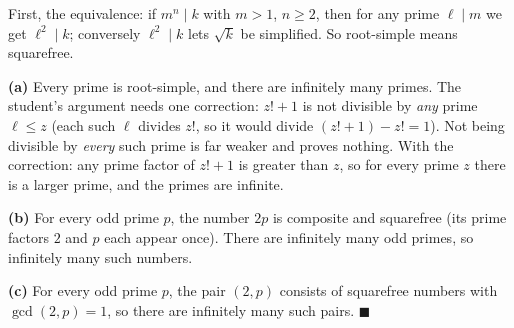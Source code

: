 First, the equivalence: if $m^n\mid k$ with $m>1$, $n\ge2$, then for any prime $\ell\mid m$ we get $\ell^2\mid k$; conversely $\ell^2\mid k$ lets $\sqrt{k}$ be simplified. So root-simple means squarefree.

\textbf{(a)} Every prime is root-simple, and there are infinitely many primes. The student's argument needs one correction: $z!+1$ is not divisible by \emph{any} prime $\ell\le z$ (each such $\ell$ divides $z!$, so it would divide $(z!+1)-z!=1$). Not being divisible by \emph{every} such prime is far weaker and proves nothing. With the correction: any prime factor of $z!+1$ is greater than $z$, so for every prime $z$ there is a larger prime, and the primes are infinite.

\textbf{(b)} For every odd prime $p$, the number $2p$ is composite and squarefree (its prime factors $2$ and $p$ each appear once). There are infinitely many odd primes, so infinitely many such numbers.

\textbf{(c)} For every odd prime $p$, the pair $(2,p)$ consists of squarefree numbers with $\gcd(2,p)=1$, so there are infinitely many such pairs. $\blacksquare$
